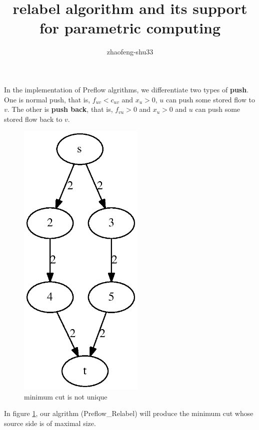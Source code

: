 \documentclass{article}
\title{relabel algorithm and its support for parametric computing}
\author{zhaofeng-shu33}
\begin{document}
\maketitle
In the implementation of Preflow algrithms, we differentiate
two types of \textbf{push}. One is normal push, that is,
$f_{uv} < c_{uv}$ and $x_u >0$, $u$ can push some stored flow
to $v$. The other is \textbf{push back}, that is,
$f_{vu} >0$ and $x_u >0$ and $u$ can push some stored flow back to $v$.

\begin{figure}[!ht]
\centering
\includegraphics[width=6cm]{fig/size.eps}
\caption{minimum cut is not unique}\label{fig:mc}
\end{figure}

In figure \ref{fig:mc}, our algrithm (Preflow\_Relabel) will produce the minimum cut whose source side is of maximal size.
\end{document}
